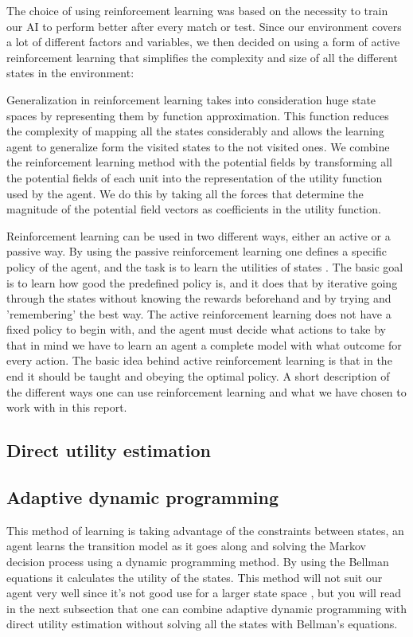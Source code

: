 	The choice of using reinforcement learning was based on the necessity to train our AI to perform better after every match or test. Since our environment covers a lot of different factors and variables, we then decided on using a form of active reinforcement learning that simplifies the complexity and size of all the different states in the environment: 

	Generalization in reinforcement learning takes into consideration huge state spaces by representing them by function approximation. This function reduces the complexity of mapping all the states considerably and allows the learning agent to generalize form the visited states to the not visited ones. We combine the reinforcement learning method with the potential fields by transforming all the potential fields of each unit into the representation of the utility function used by the agent. We do this by taking all the forces that determine the magnitude of the potential field vectors as coefficients in the utility function.
	
	
	Reinforcement learning can be used in two different ways, either an active or a passive way. By using the passive reinforcement learning one defines a specific policy of the agent, and the task is to learn the utilities of states \cite{rl}. The basic goal is to learn how good the predefined policy is, and it does that by iterative going through the states without knowing the rewards beforehand and by trying and 'remembering' the best way. The active reinforcement learning does not have a fixed policy to begin with, and the agent must decide what actions to take \cite[p771]{rl} by that in mind we have to learn an agent a complete model with what outcome for every action. The basic idea behind active reinforcement learning is that in the end it should be taught and obeying the optimal policy.
A short description of the different ways one can use reinforcement learning and what we have chosen to work with in this report.

			
\subsection*{Direct utility estimation}



\subsection*{Adaptive dynamic programming}
This method of learning is taking advantage of the constraints between states, an agent learns the transition model as it goes along and solving the Markov decision process using a dynamic programming method. By using the Bellman equations it calculates the utility of the states. This method will not suit our agent very well since it's not good use for a larger state space \cite[p. 767]{rl}, but you will read in the next subsection that one can combine adaptive dynamic programming with direct utility estimation without solving all the states with Bellman's equations. 

